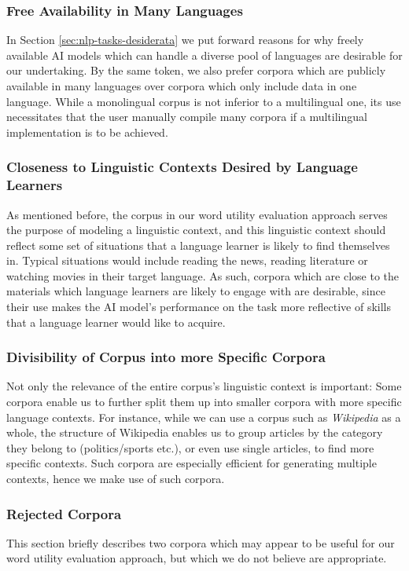 \subsubsection{Free Availability in Many Languages}
In Section \ref{sec:nlp-tasks-desiderata} we put forward reasons for why freely available AI models which can handle a diverse pool of languages are desirable for our undertaking.
By the same token, we also prefer corpora which are publicly available in many languages over corpora which only include data in one language.
While a monolingual corpus is not inferior to a multilingual one, its use necessitates that the user manually compile many corpora if a multilingual implementation is to be achieved.

\subsubsection{Closeness to Linguistic Contexts Desired by Language Learners}
As mentioned before, the corpus in our word utility evaluation approach serves the purpose of modeling a linguistic context, and this linguistic context should reflect some set of situations that a language learner is likely to find themselves in.
Typical situations would include reading the news, reading literature or watching movies in their target language.
As such, corpora which are close to the materials which language learners are likely to engage with are desirable, since their use makes the AI model's performance on the task more reflective of skills that a language learner would like to acquire.

\subsubsection{Divisibility of Corpus into more Specific Corpora}
Not only the relevance of the entire corpus's linguistic context is important:
Some corpora enable us to further split them up into smaller corpora with more specific language contexts.
For instance, while we can use a corpus such as \textit{Wikipedia} as a whole, the structure of Wikipedia enables us to group articles by the category they belong to (politics/sports etc.), or even use single articles, to find more specific contexts.
Such corpora are especially efficient for generating multiple contexts, hence we make use of such corpora.


\subsubsection{Rejected Corpora} \label{sec:rejected-corpora}
This section briefly describes two corpora which may appear to be useful for our word utility evaluation approach, but which we do not believe are appropriate.

